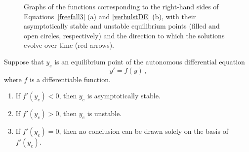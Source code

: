 \begin{example}
\begin{figure}[H]
\centering
\centerline{
\hspace{0.1cm}
}
\caption{Graphs of the functions corresponding to the right-hand sides of Equations~\eqref{freefall3} (a) and \eqref{verhulstDE} (b), with their asymptotically stable and unstable equilibrium points (filled and open circles, respectively) and the direction to which the solutions evolve over time (red arrows).} 

\end{figure}
\end{example}

\newpage 
\begin{theorem}
\label{firstdifftest}
Suppose that $y_e$ is an equilibrium point of the autonomous differential equation
$$
y'=f\left(y\right)\,,
$$
where $f$ is a differentiable function. 
\begin{enumerate}
	\item If $f'\left(y_e\right)<0$, then $y_e$ is asymptotically stable.
	\item If $f'\left(y_e\right)>0$, then $y_e$ is unstable.
	\item If $f'\left(y_e\right)=0$, then no conclusion can be drawn solely on the basis of $f'\left(y_e\right)$.
\end{enumerate}
\end{theorem}

